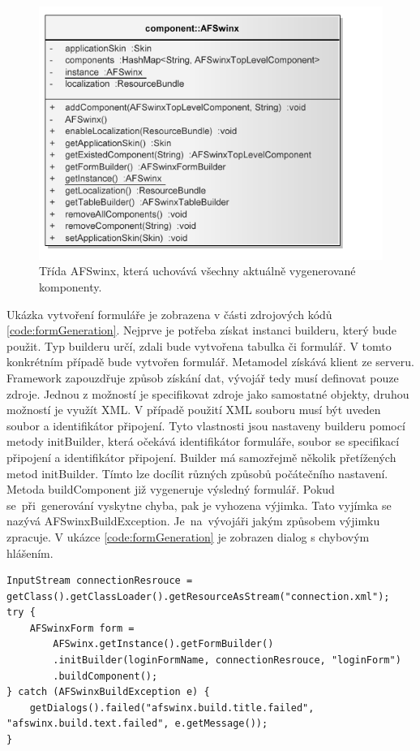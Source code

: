 \begin{figure}[h!]
\begin{center}
\includegraphics{images/afSwinx}
\caption{Třída AFSwinx, která uchovává všechny aktuálně vygenerované komponenty.}
\label{img:afSwinx}
\end{center}
\end{figure}	

Ukázka vytvoření formuláře je zobrazena v části zdrojových kódů \ref{code:formGeneration}. Nejprve je potřeba získat instanci builderu, který bude použit. Typ builderu určí, zdali bude vytvořena tabulka či formulář. V tomto konkrétním případě bude vytvořen formulář. Metamodel získává klient ze serveru. Framework zapouzdřuje způsob získání dat, vývojář tedy musí definovat pouze zdroje. Jednou z možností je specifikovat zdroje jako samostatné objekty, druhou možností je využít XML. V případě použití XML souboru musí být uveden soubor a identifikátor připojení. Tyto vlastnosti jsou nastaveny builderu pomocí metody initBuilder, která očekává identifikátor formuláře, soubor se specifikací připojení a identifikátor připojení. Builder má samozřejmě několik přetížených metod initBuilder. Tímto lze docílit různých způsobů počátečního nastavení. Metoda buildComponent již vygeneruje výsledný formulář. Pokud se~při~generování vyskytne chyba, pak je vyhozena výjimka. Tato vyjímka se nazývá AFSwinxBuildException. Je~na~vývojáři jakým způsobem výjimku zpracuje. V ukázce \ref{code:formGeneration} je zobrazen dialog s chybovým hlášením.

\begin{lstlisting}[caption={Generování formuláře na klientovi},
label={code:formGeneration}, basicstyle=\footnotesize]
InputStream connectionResrouce = getClass().getClassLoader().getResourceAsStream("connection.xml");
try {
	AFSwinxForm form =
		AFSwinx.getInstance().getFormBuilder()
		.initBuilder(loginFormName, connectionResrouce, "loginForm")
		.buildComponent();
} catch (AFSwinxBuildException e) {
	getDialogs().failed("afswinx.build.title.failed", "afswinx.build.text.failed", e.getMessage());
}
\end{lstlisting}

